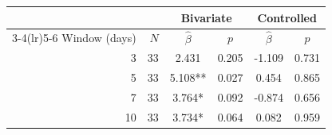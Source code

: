 \begin{tabular}{rrcccc}
\toprule
 & & \multicolumn{2}{c}{Bivariate} & \multicolumn{2}{c}{Controlled} \\
\cmidrule(lr){3-4}\cmidrule(lr){5-6}
Window (days) & $N$ & $\hat\beta$ & $p$ & $\hat\beta$ & $p$ \\
\midrule
3 & 33 & 2.431 & 0.205 & -1.109 & 0.731 \\
5 & 33 & 5.108** & 0.027 & 0.454 & 0.865 \\
7 & 33 & 3.764* & 0.092 & -0.874 & 0.656 \\
10 & 33 & 3.734* & 0.064 & 0.082 & 0.959 \\
\bottomrule
\end{tabular}